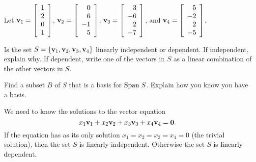 
\ExampleIntro

\begin{example} Let $\mathbf{v}_1 = \left[ \begin{array}{c} 1\\2\\0\\1 \end{array} \right]$, $\mathbf{v}_2 = \left[ \begin{array}{r} 0\\6\\-1\\5 \end{array} \right]$, $\mathbf{v}_3 = \left[ \begin{array}{r} 3\\-6\\2\\-7\end{array} \right]$, and $\mathbf{v}_4 = \left[ \begin{array}{r} 5\\-2\\2\\-5 \end{array} \right]$.
	\ba
	\item Is the set $S = \{\mathbf{v}_1, \mathbf{v}_2, \mathbf{v}_3, \mathbf{v}_4\}$ linearly independent or dependent. If independent, explain why. If dependent, write one of the vectors in $S$ as a linear combination of the other vectors in $S$.
	
	\item Find a subset $B$ of $S$ that is a basis for $\text{Span} \ S$. Explain how you know you have a basis.
	
	\ea
	
\ExampleSolution
\ba
\item We need to know the solutions to the vector equation
\[x_1 \mathbf{v}_1 + x_2 \mathbf{v}_2 + x_3 \mathbf{v}_3 + x_4 \mathbf{v}_4 = \mathbf{0}.\]
If the equation has as its only solution $x_1 = x_2 = x_3 = x_4 = 0$ (the trivial solution), then the set $S$ is linearly independent. Otherwise the set $S$ is linearly dependent.


\end{example}
